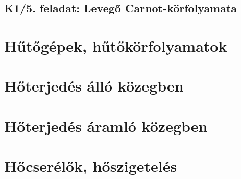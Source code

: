 \documentclass[11pt, a4paper]{report}
\begin{document}
\section*{K1/5. feladat: Levegő Carnot-körfolyamata}




\chapter{Hűtőgépek, hűtőkörfolyamatok}



\chapter{Hőterjedés álló közegben}













\chapter{Hőterjedés áramló közegben}









\chapter{Hőcserélők, hőszigetelés}




\end{document}
